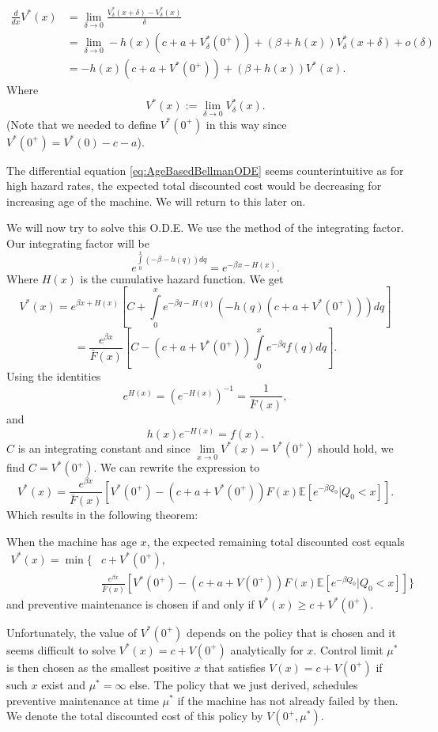 \begin{equation}\label{eq:AgeBasedBellmanODE}
\begin{split}
\frac{d}{dx}V^*(x)&=\lim\limits_{\delta\rightarrow 0} \frac{V_\delta^*(x+\delta)-V_\delta^*(x)}{\delta} \\
&=\lim\limits_{\delta\rightarrow 0} -h(x)(c+a+ V_\delta^*(0^+))+(\beta+ h(x)) V_\delta^*(x+\delta)+o(\delta)\\
&=-h(x)(c+a+ V^*(0^+))+(\beta+ h(x)) V^*(x).
\end{split}
\end{equation}
Where
$$
V^*(x):=\lim\limits_{\delta\rightarrow 0} V^*_\delta(x).
$$
(Note that we needed to define $V^*(0^+)$ in this way since $V^*(0^+)=V^*(0)-c-a$).
\begin{remark}\label{remark:AgeBasedWeirdODE}
	The differential equation \eqref{eq:AgeBasedBellmanODE} seems counterintuitive as for high hazard rates, the expected total discounted cost would be decreasing for increasing age of the machine.
	We will return to this later on.
\end{remark}
We will now try to solve this O.D.E.
We use the method of the integrating factor.
Our integrating factor will be
$$
e^{\int\limits_0^x (-\beta - h(q))dq}=e^{-\beta x -H(x)}.
$$
Where $H(x)$ is the cumulative hazard function.
We get
$$
V^*(x)=e^{\beta x +H(x)} [C + \int\limits_0^x e^{-\beta q -H(q)}(-h(q)(c+a+V^*(0^+)))dq]
$$
$$
=\frac{e^{\beta x}}{\bar F(x)} [C - (c+a+V^*(0^+))\int\limits_0^x e^{-\beta q}f(q)dq].
$$
Using the identities 
\[e^{H(x)}=(e^{-H(x)})^{-1}=\frac{1}{\bar F(x)},\]
and
\[h(x)e^{-H(x)}=f(x).\]
$C$ is an integrating constant and since $\lim\limits_{x\rightarrow 0}V^*(x)=V^*(0^+)$ should hold, we find $C=V^*(0^+)$.
We can rewrite the expression to
$$
V^*(x)=\frac{e^{\beta x}}{\bar F(x)} [V^*(0^+)  - (c+a+V^*(0^+))F(x)\mathbb{E}[e^{-\beta Q_0}|Q_0<x]].
$$
Which results in the following theorem:
\begin{theorem}
	When the machine has age $x$, the expected remaining total discounted cost equals
	\begin{equation}\label{eq:AgeBasedSolvedBellman}
	\begin{split}
	V^*(x)=\min\{&c+V^*(0^+),\\
	&\frac{ e^{\beta x}}{\bar F(x)} [V^*(0^+) - (c+a+V(0^+))F(x)\mathbb{E}[e^{-\beta Q_0}|Q_0<x]]
	\}
	\end{split}
	\end{equation}
	and preventive maintenance is chosen if and only if $V^*(x)\geq c+V^*(0^+)$.
\end{theorem}
Unfortunately, the value of $V^*(0^+)$ depends on the policy that is chosen and it seems difficult to solve $V^*(x)=c+V(0^+)$ analytically for $x$.
Control limit $\mu^*$ is then chosen as the smallest positive $x$ that satisfies $V(x)=c+V(0^+)$ if such $x$ exist and $\mu^*=\infty$ else.
The policy that we just derived, schedules preventive maintenance at time $\mu^*$ if the machine has not already failed by then.
We denote the total discounted cost of this policy by $V(0^+,\mu^*)$.

